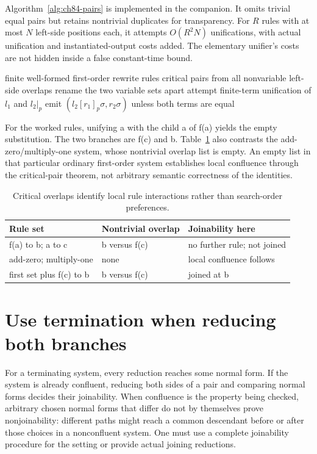 Algorithm~\ref{alg:ch84-pairs} is implemented in the companion.
It omits trivial equal pairs but retains nontrivial duplicates for transparency.
For $R$ rules with at most $N$ left-side positions each, it attempts $O(R^2N)$ unifications, with actual unification and instantiated-output costs added.
The elementary unifier's costs are not hidden inside a false constant-time bound.

\begin{algorithm}[htbp]
\caption{Enumerate first-order critical overlaps with disjoint variable namespaces.}
\label{alg:ch84-pairs}
\begin{pseudocode}
\Require finite well-formed first-order rewrite rules
\Ensure critical pairs from all nonvariable left-side overlaps
\State rename the two variable sets apart
\State attempt finite-term unification of $l_1$ and $l_2|_p$
\State emit $(l_2[r_1]_p\sigma,r_2\sigma)$ unless both terms are equal
\EndIf
\EndFor
\EndFor
\end{pseudocode}
\end{algorithm}

For the worked rules, unifying a with the child a of f(a) yields the empty substitution.
The two branches are f(c) and b.
Table~\ref{tab:ch84-pairs} also contrasts the add-zero/multiply-one system, whose nontrivial overlap list is empty.
An empty list in that particular ordinary first-order system establishes local confluence through the critical-pair theorem, not arbitrary semantic correctness of the identities.

\begin{table}[htbp]
\caption{Critical overlaps identify local rule interactions rather than search-order preferences.}
\label{tab:ch84-pairs}
\centering
\begin{tabular}{lll}
\toprule
Rule set & Nontrivial overlap & Joinability here \\
\midrule
f(a) to b; a to c & b versus f(c) & no further rule; not joined \\
add-zero; multiply-one & none & local confluence follows \\
first set plus f(c) to b & b versus f(c) & joined at b \\
\bottomrule
\end{tabular}
\end{table}

\section{Use termination when reducing both branches}
\label{sec:ch84-join}
For a terminating system, every reduction reaches some normal form.
If the system is already confluent, reducing both sides of a pair and comparing normal forms decides their joinability.
When confluence is the property being checked, arbitrary chosen normal forms that differ do not by themselves prove nonjoinability: different paths might reach a common descendant before or after those choices in a nonconfluent system.
One must use a complete joinability procedure for the setting or provide actual joining reductions.


